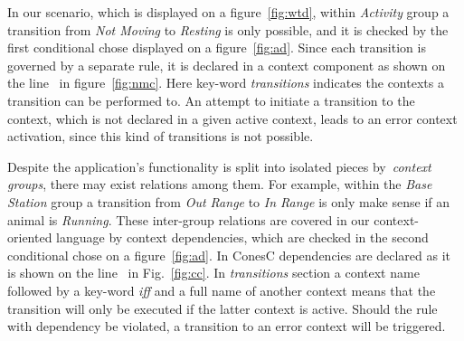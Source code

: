 
In our scenario, which is displayed on a figure~\ref{fig:wtd}, within \emph{Activity} group a
transition from \emph{Not Moving} to \emph{Resting} is only possible, and it is checked
by the first conditional chose displayed on a figure~\ref{fig:ad}.
Since each transition is governed by a separate rule, it is declared in a context component as shown
on the line~ in figure~\ref{fig:nmc}. Here key-word \emph{transitions}
indicates the contexts a transition can be performed to. An attempt to initiate
a transition to the context, which is not declared in a given active context, leads to an error context
activation, since this kind of transitions is not possible.


Despite the application's  functionality is split into isolated pieces by~\emph{context groups},
there may exist relations among them. For example, within the 
\emph{Base Station} group a transition from \emph{Out Range} to \emph{In Range} is only
make sense if an animal is \emph{Running}. These inter-group relations are covered in our
context-oriented language by context dependencies, which are checked in the second
conditional chose on a figure~\ref{fig:ad}. In ConesC dependencies are declared as
it is shown on the line~ in Fig.~\ref{fig:cc}. In \emph{transitions} section a
context name followed by a key-word \emph{iff} and a full name of another context means that
the transition will only be executed if the latter context is active. Should the rule with dependency
be violated, a transition to an error context will be triggered.

